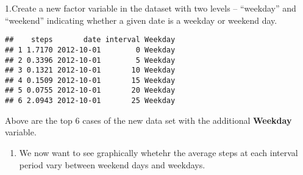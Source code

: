 \documentclass[]{article}
\newenvironment{Shaded}{\begin{snugshade}}{\end{snugshade}}
\newcommand{\KeywordTok}[1]{\textcolor[rgb]{0.13,0.29,0.53}{\textbf{{#1}}}}
\newcommand{\DecValTok}[1]{\textcolor[rgb]{0.00,0.00,0.81}{{#1}}}
\newcommand{\StringTok}[1]{\textcolor[rgb]{0.31,0.60,0.02}{{#1}}}
\newcommand{\CommentTok}[1]{\textcolor[rgb]{0.56,0.35,0.01}{\textit{{#1}}}}
\newcommand{\OtherTok}[1]{\textcolor[rgb]{0.56,0.35,0.01}{{#1}}}
\newcommand{\NormalTok}[1]{{#1}}
\providecommand{\tightlist}{%
  \setlength{\itemsep}{0pt}\setlength{\parskip}{0pt}}
\begin{document}
1.Create a new factor variable in the dataset with two levels --
``weekday'' and ``weekend'' indicating whether a given date is a weekday
or weekend day.

\begin{Shaded}
\end{Shaded}

\begin{verbatim}
##    steps       date interval Weekday
## 1 1.7170 2012-10-01        0 Weekday
## 2 0.3396 2012-10-01        5 Weekday
## 3 0.1321 2012-10-01       10 Weekday
## 4 0.1509 2012-10-01       15 Weekday
## 5 0.0755 2012-10-01       20 Weekday
## 6 2.0943 2012-10-01       25 Weekday
\end{verbatim}

Above are the top 6 cases of the new data set with the additional
\textbf{Weekday} variable.

\begin{enumerate}
\def\labelenumi{\arabic{enumi}.}
\setcounter{enumi}{1}
\tightlist
\item
  We now want to see graphically whetehr the average steps at each
  interval period vary between weekend days and weekdays.
\end{enumerate}
\end{document}
